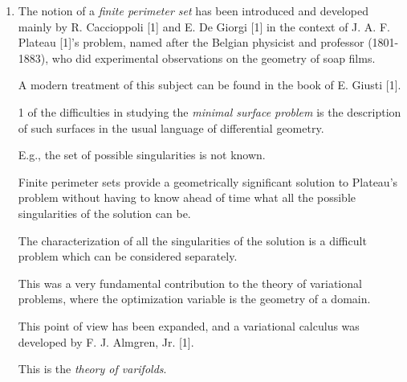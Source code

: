 \documentclass{book}
\numberwithin{equation}{section}
\begin{document}
\begin{enumerate}
    \item The notion of a \textit{finite perimeter set} has been introduced and developed mainly by R. Caccioppoli [1] and E. De Giorgi [1] in the context of J. A. F. Plateau [1]'s problem, named after the Belgian physicist and professor (1801-1883), who did experimental observations on the geometry of soap films.
    
    A modern treatment of this subject can be found in the book of E. Giusti [1].
    
    1 of the difficulties in studying the \textit{minimal surface problem} is the description of such surfaces in the usual language of differential geometry.
    
    E.g., the set of possible singularities is
    not known.
    
    Finite perimeter sets provide a geometrically significant solution to Plateau's problem without having to know ahead of time what all the possible singularities of the solution can be.
    
    The characterization of all the singularities of the solution is a difficult problem which can be considered separately.
    
    This was a very fundamental contribution to the theory of variational problems, where the optimization variable is the geometry of a domain.
    
    This point of view has been expanded, and a variational calculus was developed by F. J. Almgren, Jr. [1].
    
    This is the \textit{theory of varifolds}.
    

\end{enumerate}
\end{document}
